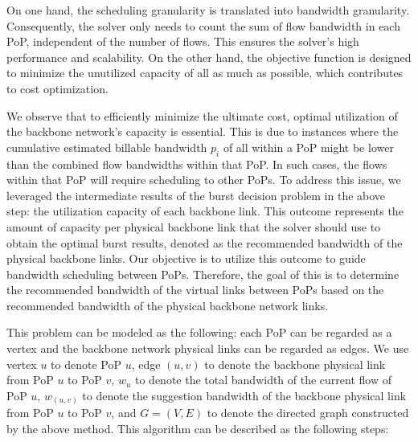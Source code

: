 On one hand, the scheduling granularity is translated into bandwidth granularity. Consequently, the solver only needs to count the sum of flow bandwidth in each PoP, independent of the number of flows. This ensures the solver's high performance and scalability. On the other hand, the objective function is designed to minimize the 
unutilized capacity of all {\egresses} as much as possible, which contributes to cost optimization.


{ We observe that to efficiently minimize the ultimate cost, optimal utilization of the backbone network's capacity is essential. This is due to instances where the cumulative estimated billable bandwidth $p_i$ of all {\egresses} within a PoP might be lower than the combined flow bandwidths within that PoP. In such cases, the flows within that PoP will require scheduling to other PoPs. To address this issue, we leveraged the intermediate results of the burst decision problem in the above step: the utilization capacity of each backbone link. This outcome represents the amount of capacity per physical backbone link that the solver should use to obtain the optimal burst results, denoted as the recommended bandwidth of the physical backbone links. Our objective is to utilize this outcome to guide bandwidth scheduling between PoPs. Therefore, the goal of this is to determine the recommended bandwidth of the virtual links between PoPs based on the recommended bandwidth of the physical backbone network links.}

{This problem can be modeled as the following: each PoP can be regarded as a vertex and the backbone network physical links can be regarded as edges. We use vertex $u$ to denote PoP $u$, edge $(u,v)$ to denote the backbone physical link from PoP $u$ to PoP $v$, $w_u$ to denote the total bandwidth of the current flow of PoP $u$, $w_{(u,v)}$ to denote the suggestion bandwidth of the backbone physical link from PoP $u$ to PoP $v$, and $G=(V, E)$ to denote the directed graph constructed by the above method. This algorithm can be described as the following steps:}

